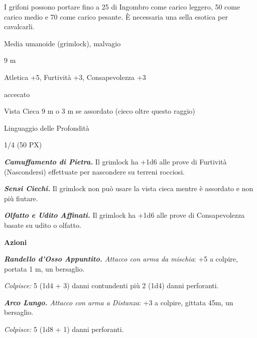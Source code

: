 \begin{multicols}{2}
{I grifoni possono portare fino a 25 di Ingombro come carico leggero, 50 come carico medio e 70 come carico pesante. È necessaria una sella esotica per cavalcarli.

\begin{description}[noitemsep, topsep=0pt, parsep=0pt, partopsep=0pt, itemsep=1pt, leftmargin=2.35cm,  labelwidth=2.2cm, itemindent=0cm, listparindent=0pt] %
\setlength{\baselineskip}{10pt}
\item[\textbf{Taglia/Tipo}] Media umanoide (grimlock), malvagio
\item[\textbf{Caratt.}] 
\item[\textbf{Punti Ferita}] 
\item[\textbf{Movimento}] 9 m
\item[\textbf{Tiri Salvez.}] 
\item[\textbf{Comp.}] Atletica +5, Furtività +3, Consapevolezza +3
\item[\textbf{Immunità}] accecato
\item[\textbf{Sensi}] Vista Cieca 9 m o 3 m se assordato (cieco oltre questo raggio)
\item[\textbf{Linguaggi}] Linguaggio delle Profondità
\item[\textbf{Sfida}] 1/4 (50 PX)
\end{description}
\smallskip

\emph{\textbf{Camuffamento di Pietra.}} Il grimlock ha +1d6 alle prove di Furtività (Nascondersi) effettuate per nascondere su terreni rocciosi.

\emph{\textbf{Sensi Ciechi.}} Il grimlock non può usare la vista cieca mentre è assordato e non più fiutare.

\emph{\textbf{Olfatto e Udito Affinati.}} Il grimlock ha +1d6 alle prove di Consapevolezza basate su udito o olfatto.

\textbf{Azioni}

\emph{\textbf{Randello d'Osso Appuntito.} Attacco con arma da mischia}: +5 a colpire, portata 1 m, un bersaglio.

\emph{Colpisce:} 5 (1d4 + 3) danni contundenti più 2 (1d4) danni perforanti.

\emph{\textbf{Arco Lungo.} Attacco con arma a Distanza}: +3 a colpire, gittata 45m, un bersaglio.

\emph{Colpisce:} 5 (1d8 + 1) danni perforanti.

}
\end{multicols}

